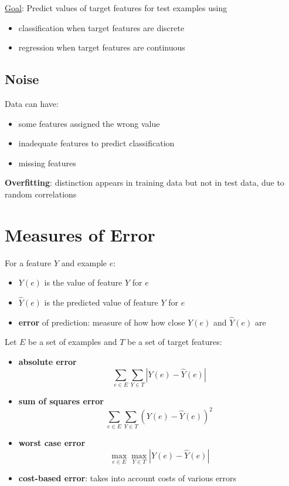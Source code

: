 \documentclass[11pt]{article}
\begin{document}
\uline{Goal}: Predict values of target features for test examples using
\begin{itemize}
\item classification when target features are discrete
\item regression when target features are continuous
\end{itemize}
\subsection{Noise}
\label{sec:org4fab7a9}
Data can have:
\begin{itemize}
\item some features assigned the wrong value
\item inadequate features to predict classification
\item missing features
\end{itemize}

\textbf{Overfitting}: distinction appears in training data but not in test data, due to random correlations
\section{Measures of Error}
\label{sec:org6f981b4}
For a feature \(Y\) and example \(e\):
\begin{itemize}
\item \(Y(e)\) is the value of feature \(Y\) for \(e\)
\item \(\hat{Y}(e)\) is the predicted value of feature \(Y\) for \(e\)
\item \textbf{error} of prediction: measure of how how close \(Y(e)\) and \(\hat{Y}(e)\) are
\end{itemize}

Let \(E\) be a set of examples and \(T\) be a set of target features:
\begin{itemize}
\item \textbf{absolute error}
$$
  \sum_{e \in E} \sum_{Y \in T} \left| Y(e) - \hat{Y}(e) \right|
  $$
\item \textbf{sum of squares error}
$$
  \sum_{e \in E} \sum_{Y \in T} \left( Y(e) - \hat{Y}(e) \right)^{2}
  $$
\item \textbf{worst case error}
$$
  \max_{e \in E} \max_{Y \in T} \left| Y(e) - \hat{Y}(e) \right|
  $$
\item \textbf{cost-based error}: takes into account costs of various errors
\end{itemize}
\end{document}
